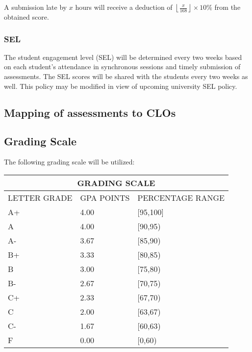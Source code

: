 \documentclass[a4paper,11pt]{article}
\begin{document}
A submission late by $x$ hours will receive a deduction of $\left\lfloor\frac{x}{168}\right\rfloor\times 10\%$ from the obtained score. 

\subsubsection{SEL}
The student engagement level (SEL) will be determined every two weeks based on each student's attendance in synchronous sessions and timely submission of assessments. The SEL scores will be shared with the students every two weeks as well. This policy may be modified in view of upcoming university SEL policy. 


\subsection{Mapping of assessments to CLOs}
\subsection{Grading Scale}
The following grading scale will be utilized:
\begin{table}[h!]
	\centering
	\begin{tabular}{|l|l|l|}
		\hline
		\multicolumn{3}{c}{GRADING SCALE}\\
		\hline 
		LETTER GRADE & GPA POINTS & PERCENTAGE RANGE \\
		\hline
		A+ & 4.00 & [95,100] \\
		\hline
		A & 4.00 & [90,95) \\
		\hline
		A- & 3.67 & [85,90) \\
		\hline
		B+ & 3.33 & [80,85) \\
		\hline
		B & 3.00 & [75,80) \\
		\hline
		B- & 2.67 & [70,75) \\
		\hline
		C+ & 2.33 & [67,70) \\
		\hline
		C & 2.00 & [63,67) \\
		\hline
		C- & 1.67 & [60,63) \\
		\hline
		F & 0.00 & [0,60) \\
		\hline
	\end{tabular}
\end{table}
\end{document}
